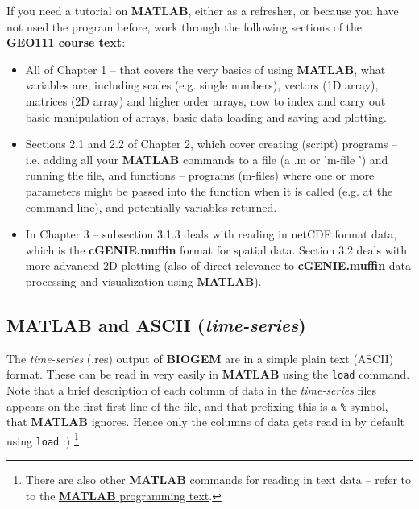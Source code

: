 \documentclass[11pt,fleqn]{book} %
\begin{document}
If you need a tutorial on \textbf{MATLAB}, either as a refresher, or because you have not used the program before, work through the following sections of the \href{http://www.seao2.info//teaching/201718.GEO111/GEO111.pdf\#http://www.seao2.info//teaching/201718.GEO111/GEO111.pdf}{\textbf{GEO111 course text}}:

\vspace{4pt}
\begin{itemize}
\item All of Chapter 1 --  that covers the very basics of using \textbf{MATLAB}, what variables are, including scales (e.g. single numbers), vectors (1D array), matrices (2D array) and higher order arrays, now to index and carry out basic manipulation of arrays, basic data loading and saving and plotting.
\item Sections 2.1 and 2.2 of Chapter 2, which cover creating (script) programs -- i.e. adding all your \textbf{MATLAB} commands to a file (a \footnotesize\textsf{.m }\normalsize or '\footnotesize\textsf{m-file }\normalsize') and running the file, and functions -- programs (\footnotesize\textsf{m-file}\normalsize s) where one or more parameters might be passed into the function when it is called (e.g. at the command line), and potentially variables returned.
\item In Chapter 3 -- subsection 3.1.3 deals with reading in netCDF format data, which is the \textbf{cGENIE.muffin} format for spatial data. Section 3.2 deals with more advanced 2D plotting (also of direct relevance to \textbf{cGENIE.muffin} data processing and visualization using \textbf{MATLAB}).
\end{itemize}
\vspace{4pt}


\subsection{MATLAB and ASCII (\textit{time-series})}

The \textit{time-series} (\textsf{\footnotesize .res}) output of \textbf{BIOGEM} are in a simple plain text (ASCII) format. These can be read in very easily in \textbf{MATLAB} using the \texttt{load} command. Note that a brief description of each column of data in the \textit{time-series} files appears on the first first line of the file, and that prefixing this is a \texttt{\%} symbol, that \textbf{MATLAB} ignores. Hence only the columns of data gets read in by default using \texttt{load} :) \footnote{There are also other \textbf{MATLAB} commands for reading in text data -- refer to to the \href{http://www.seao2.info//teaching/201718.GEO111/GEO111.pdf}{\textbf{MATLAB} programming text}.}
\end{document}
